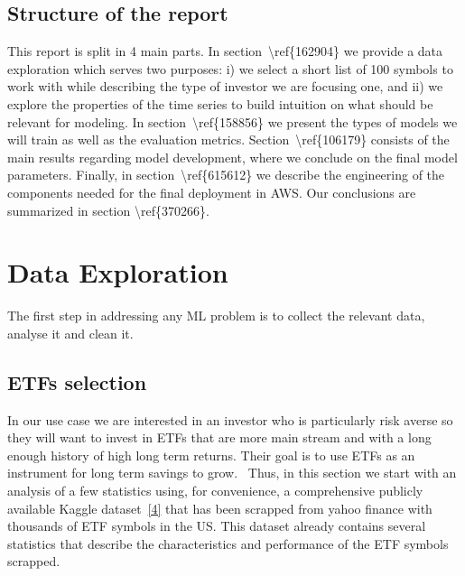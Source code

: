 \documentclass[10pt]{article}
\begin{document}
\hypertarget{structure-of-the-report}{%
\subsection{Structure of the report}}

{\label{686593}}

This report is split in 4 main parts. In
section~{\textbackslash ref\{162904\}} we provide a data exploration
which serves two purposes: i) we select a short list of 100 symbols to
work with while describing the type of investor we are focusing one, and
ii) we explore the properties of the time series to build intuition on
what should be relevant for modeling. In
section~{\textbackslash ref\{158856\}} we present the types of models we
will train as well as the evaluation metrics.
Section~{\textbackslash ref\{106179\}} consists of the main results
regarding model development, where we conclude on the final model
parameters. Finally, in section~{\textbackslash ref\{615612\}} we
describe the engineering of the components needed for the final
deployment in AWS. Our conclusions are summarized in section
{\textbackslash ref\{370266\}}.~~

\hypertarget{data-exploration}{%
\section{Data Exploration}}

{\label{162904}}

The first step in addressing any ML problem is to collect the relevant
data, analyse it and clean it.

\hypertarget{etfs-selection}{%
\subsection{ETFs selection~}\label{etfs-selection}}

In our use case we are interested in an investor who is particularly
risk averse so they will want to invest in ETFs that are more main
stream and with a long enough history of high long term returns. Their
goal is to use ETFs as an instrument for long term savings to grow.~
Thus, in this section we start with an analysis of a few statistics
using, for convenience, a comprehensive publicly available Kaggle
dataset~\hyperref[csl:4]{[4]} that has been scrapped from yahoo finance
with thousands of ETF symbols in the US. This dataset already contains
several statistics that describe the characteristics and performance of
the ETF symbols scrapped.
\end{document}
